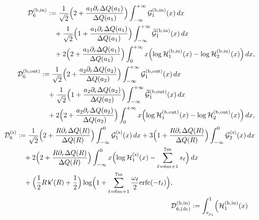 \documentclass[a4paper]{article}
\newcommand{\erfc}{{\rm erfc}}
\numberwithin{equation}{section}
\begin{document}
\begin{align}
\begin{split}
\mathcal{D}_6^{(\mathrm{b,in})}
&:=
\frac{1}{\sqrt{2}}\Bigl(2+\frac{a_1\partial_r\Delta Q(a_1)}{\Delta Q(a_1)}\Bigr)
\int_{-\infty}^{+\infty}
\mathcal{G}_1^{(\mathrm{b,in})}(x)\,dx
\\
&\quad
+
\frac{1}{\sqrt{2}}
\Bigl(1+\frac{a_1\partial_r\Delta Q(a_1)}{\Delta Q(a_1)}\Bigr)
\int_{-\infty}^{+\infty}
\widetilde{\mathcal{G}}_1^{(\mathrm{b,in})}(x)
\,dx  
\\
&\quad
+2\Bigl(
2+\frac{a_1\partial_r\Delta Q(a_1)}{\Delta Q(a_1)}
\Bigr)
\int_{0}^{+\infty}
x\Bigl( 
\log\mathcal{H}_1^{(\mathrm{b,in})}(x)-\log\mathcal{H}_2^{(\mathrm{b,in})}(x)
\Bigr)\,dx, 
\end{split}
\\
\begin{split}
\mathcal{D}_6^{(\mathrm{b,out})}
&:=
\frac{1}{\sqrt{2}}\Bigl(2+\frac{a_2\partial_r\Delta Q(a_2)}{\Delta Q(a_2)}\Bigr)
\int_{-\infty}^{+\infty}
\mathcal{G}_1^{(\mathrm{b,out})}(x)
\,dx
\\
&\quad
+
\frac{1}{\sqrt{2}}
\Bigl(1+\frac{a_2\partial_r\Delta Q(a_2)}{\Delta Q(a_2)}\Bigr)
\int_{-\infty}^{+\infty}
\widetilde{\mathcal{G}}_1^{(\mathrm{b,out})}(x)
\,dx  
\\
&\quad
+2\Bigl(
2+\frac{a_2\partial_r\Delta Q(a_2)}{\Delta Q(a_2)}
\Bigr)
\int_{0}^{+\infty}
x\Bigl( 
\log\mathcal{H}_1^{(\mathrm{b,out})}(x)-\log\mathcal{H}_2^{(\mathrm{b,out})}(x)
\Bigr)\,dx, 
\end{split}
\\
\begin{split}
\mathcal{D}_6^{(\mathrm{s})}
&:=
\frac{1}{\sqrt{2}}\Bigl(2+\frac{R\partial_r\Delta Q(R)}{\Delta Q(R)}\Bigr)
\int_{-\infty}^{0}
\mathcal{G}_1^{(\mathrm{s})}(x)\,dx
+
3\Bigl(1+\frac{R\partial_r\Delta Q(R)}{\Delta Q(R)}\Bigr)
\int_{-\infty}^{0}
\mathcal{G}_2^{(\mathrm{s})}(x)
\,dx
\\
&\quad
+2\Bigl(
2+\frac{R\partial_r\Delta Q(R)}{\Delta Q(R)}
\Bigr)
\int_{-\infty}^{0}
x\Bigl(\log\mathcal{H}_1^{(\mathrm{s})}(x)-\sum_{\ell=6m+1}^{7m}s_{\ell}\Bigr)
\,dx
\\
&\quad
+\Bigl(\frac{1}{2}R\,\mathsf{k}'(R)+\frac{1}{2}\Bigr)
\log\Bigl(1+\sum_{\ell=6m+1}^{7m}
\frac{\omega_{\ell}}{2}\erfc(-t_{\ell})\Bigr),
\end{split}
\\
\begin{split}
\mathcal{D}_{6,(\mathrm{dc})}^{(\mathrm{h,in})}&:=    
\int_{\tau_{\rho_1}}^{1}
\Bigl(
\mathcal{H}_1^{(\mathrm{h,in})}(x)

\end{split}
\end{align}
\end{document}

